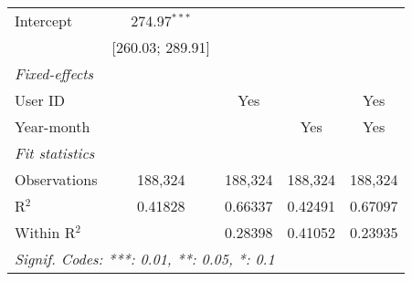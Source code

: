 \begin{table}[htbp]
\begin{threeparttable}[b]
\begin{tabular}{lcccc}
         Intercept                         & 274.97$^{***}$     &                    &                  &   \\   
                                           & [260.03; 289.91]   &                    &                  &   \\   
         \midrule
         \emph{Fixed-effects}\\
         User ID                           &                    & Yes                &                  & Yes\\  
         Year-month                        &                    &                    & Yes              & Yes\\  
         \midrule
         \emph{Fit statistics}\\
         Observations                      & 188,324            & 188,324            & 188,324          & 188,324\\  
         R$^2$                             & 0.41828            & 0.66337            & 0.42491          & 0.67097\\  
         Within R$^2$                      &                    & 0.28398            & 0.41052          & 0.23935\\  
         \midrule \midrule
         \multicolumn{5}{l}{\emph{Signif. Codes: ***: 0.01, **: 0.05, *: 0.1}}\\
      \end{tabular}
   \end{threeparttable}
\end{table}


